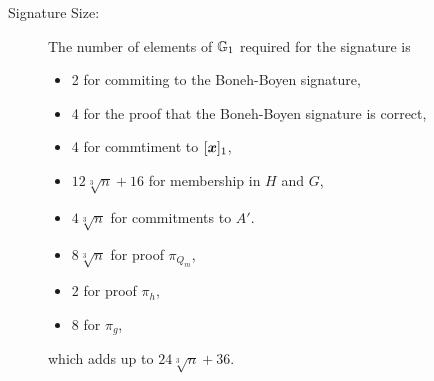 
\begin{description}
\item[Signature Size:] The number of elements of $\mathbb{G}_1$ required  for the signature is
\begin{itemize}
\item 2 for commiting to the Boneh-Boyen signature,
\item 4 for the proof that the Boneh-Boyen signature is correct,
\item 4 for commtiment to $[{\boldsymbol{x}}]_1$,
\item $12\sqrt[3]{n} + 16$ for membership in $H$ and $G$,
\item $4\sqrt[3]{n}$ for commitments to $A'$.
\item $8\sqrt[3]{n}$ for proof  $\pi_{Q_m}$,
\item $2$ for proof $\pi_h$,
\item $8$ for $\pi_g$,
\end{itemize}
which adds up to $24\sqrt[3]{n} + 36$.


\end{description}
